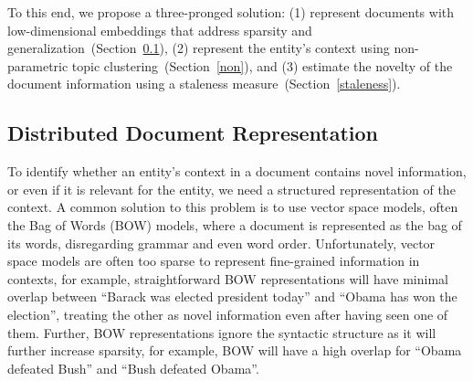 \documentclass{article}
\begin{document}
To this end, we propose a three-pronged solution:
(1) represent documents with low-dimensional embeddings that address sparsity and generalization~(Section~\ref{docwordemb}), 
(2) represent the entity's context using non-parametric topic clustering~(Section~\ref{non}), and 
(3) estimate the novelty of the document information using a staleness measure~(Section~\ref{staleness}).


\subsection{Distributed Document Representation}
\label{docwordemb}

To identify whether an entity's context in a document contains novel information, or even if it is relevant for the entity, we need a structured representation of the context. %
A common solution to this problem is to use vector space models, often the Bag of Words (BOW) models, where a document is represented as the bag of its words, disregarding grammar and even word order. 
Unfortunately, vector space models are often too sparse to represent fine-grained information in contexts, for example, straightforward BOW representations will have minimal overlap between ``Barack was elected president today'' and ``Obama has won the election'', treating the other as novel information even after having seen one of them.
Further, BOW representations ignore the syntactic structure as it will further increase sparsity, for example, BOW will have a high overlap for ``Obama defeated Bush'' and ``Bush defeated Obama''.
\end{document}
